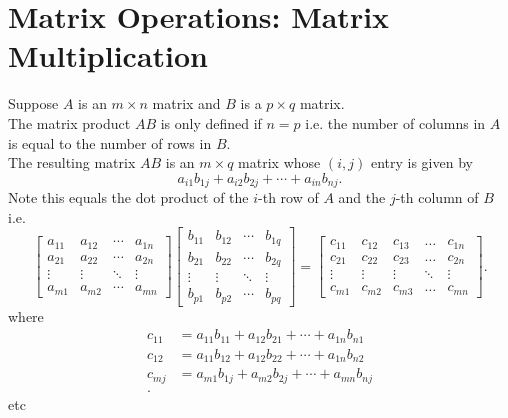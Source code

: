\documentclass{report}
\begin{document}
 \section{Matrix Operations: Matrix Multiplication}
 Suppose $ A$ is an $ m \times  n$ matrix and $ B$ is a $ p \times  q$ matrix.\\ 
 The matrix product $ AB$ is only defined if $ n = p$ i.e. the number of columns in $ A$ is equal to the number of rows in $ B$.\\
 The resulting matrix $ AB$ is an $ m \times q$ matrix whose $ (i,j)$ entry is given by\[
 a_{i 1} b_{ 1 j}+ a_{i 2} b_{ 2 j} + \cdots + a_{i n} b_{ n j} 
 .\] 
 Note this equals the dot product of the $ i$-th row of $ A$ and the $ j$-th column of $ B$ i.e. 
 \[
  \begin{bmatrix}
      a_{11} & a_{12} & \cdots & a_{1n} \\[2pt]
      a_{21} & a_{22} & \cdots & a_{2n} \\[2pt]
      \vdots & \vdots & \ddots & \vdots \\[2pt]
      a_{m1} & a_{m2} & \cdots & a_{mn}
    \end{bmatrix}
    \begin{bmatrix}
      b_{11} & b_{12} & \cdots & b_{1q} \\[2pt]
      b_{21} & b_{22} & \cdots & b_{2q} \\[2pt]
      \vdots & \vdots & \ddots & \vdots \\[2pt]
      b_{p1} & b_{p2} & \cdots & b_{pq}
      \end{bmatrix}
      = 
        \begin{bmatrix}
             c_{11} & c_{12} & c_{ 1 3} & \dots  & c_{1n} \\
             c_{21} & c_{ 2 2} & c_{ 2 3} & \dots  & c_{2n} \\
             \vdots & \vdots & \vdots & \ddots & \vdots \\
             c_{ m 1} & c_{m 2} & c_{ m 3} & \dots  & c_{mn}
        \end{bmatrix} 
 .\]
 where 
 \begin{align*}
   c_{ 1 1} &= a_{11} b_{11} + a_{12} b_{21} + \cdots + a_{1n} b_{n1} \\
    c_{ 1 2} &= a_{11} b_{12} + a_{12} b_{22} + \cdots + a_{1n} b_{n2} \\
    c_{ m j} &= a_{m1} b_{1j} + a_{m2} b_{2j} + \cdots + a_{mn} b_{nj} \\
 .\end{align*}
etc\\                   
\end{document}
